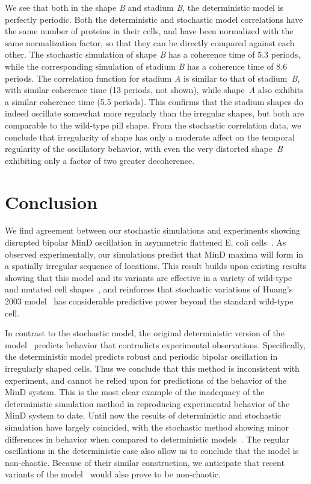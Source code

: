 \documentclass[10pt,letterpaper]{article}
\begin{document}
We see that both in the shape \emph{B} and stadium \emph{B}, the
deterministic model is perfectly periodic.  Both the deterministic and
stochastic model correlations have the same number of proteins in
their cells, and have been normalized with the same normalization
factor, so that they can be directly compared against each other.  The
stochastic simulation of shape \emph{B} has a coherence time of 5.3
periods, while the corresponding simulation of stadium \emph{B} has a
coherence time of 8.6 periods.
%
The correlation function for stadium \emph{A} is similar to that of
stadium~\emph{B}, with similar coherence time (13 periods, not shown),
while shape~\emph{A} also exhibits a similar coherence time (5.5
periods).  This confirms that the stadium shapes do indeed oscillate
somewhat more regularly than the irregular shapes, but both are
comparable to the wild-type pill shape.
%
From the stochastic correlation data, we conclude that irregularity of
shape has only a moderate affect on the temporal regularity of the
oscillatory behavior, with even the very distorted shape~\emph{B}
exhibiting only a factor of two greater decoherence.

\section*{Conclusion}
We find agreement between our stochastic simulations and experiments
showing disrupted bipolar MinD oscillation in asymmetric flattened
E. coli cells~\cite{mannik2012robustness}.  As observed
experimentally, our simulations predict that MinD maxima will form in
a spatially irregular sequence of locations.  This result builds upon
existing results showing that this model and its variants are
effective in a variety of wild-type and mutated cell
shapes~\cite{fange2006noise, varma2008min, kruse2007experimentalist},
and reinforces that stochastic variations of Huang's 2003
model~\cite{fange2006noise, kerr2006division} has considerable
predictive power beyond the standard wild-type cell.

In contrast to the stochastic model, the original deterministic
version of the model~\cite{huang2003dynamic} predicts behavior that
contradicts experimental observations.  Specifically, the
deterministic model predicts robust and periodic bipolar oscillation
in irregularly shaped cells.  Thus we conclude that this method is
inconsistent with experiment, and cannot be relied upon for
predictions of the behavior of the MinD system.  This is the most
clear example of the inadequacy of the deterministic simulation method
in reproducing experimental behavior of the MinD system to date.
Until now the results of deterministic and stochastic simulation have
largely coincided, with the stochastic method showing minor
differences in behavior when compared to deterministic
models~\cite{kerr2006division, fange2006noise, huang2004min,
  kruse2007experimentalist}.  The regular oscillations in the
deterministic case also allow us to conclude that the model is
non-chaotic.  Because of their similar construction, we anticipate
that recent variants of the model~\cite{bonny2013membrane,
  fange2006noise, halatek2012highly} would also prove to be
non-chaotic.
\end{document}
